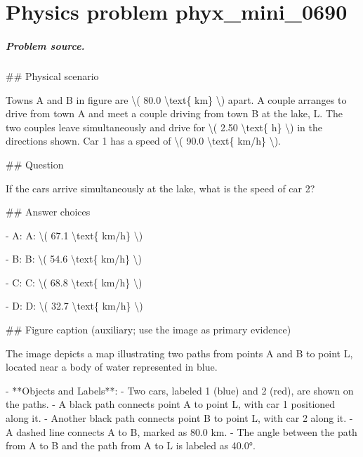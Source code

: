 
\chapter{Physics problem phyx\_mini\_0690}
\label{ch:PhyXMiniProblems_problem_phyx_mini_0690}

\paragraph{Problem source.}
\#\# Physical scenario

Towns A and B in figure are \textbackslash{}( 80.0 \textbackslash{}text\{ km\} \textbackslash{}) apart. A couple arranges to drive from town A and meet a couple driving from town B at the lake, L. The two couples leave simultaneously and drive for \textbackslash{}( 2.50 \textbackslash{}text\{ h\} \textbackslash{}) in the directions shown. Car 1 has a speed of \textbackslash{}( 90.0 \textbackslash{}text\{ km/h\} \textbackslash{}).

\#\# Question

If the cars arrive simultaneously at the lake, what is the speed of car 2?

\#\# Answer choices

- A: A: \textbackslash{}( 67.1 \textbackslash{}text\{ km/h\} \textbackslash{})

- B: B: \textbackslash{}( 54.6 \textbackslash{}text\{ km/h\} \textbackslash{})

- C: C: \textbackslash{}( 68.8 \textbackslash{}text\{ km/h\} \textbackslash{})

- D: D: \textbackslash{}( 32.7 \textbackslash{}text\{ km/h\} \textbackslash{})

\#\# Figure caption (auxiliary; use the image as primary evidence)

The image depicts a map illustrating two paths from points A and B to point L, located near a body of water represented in blue. 

- **Objects and Labels**: 
  - Two cars, labeled 1 (blue) and 2 (red), are shown on the paths.
  - A black path connects point A to point L, with car 1 positioned along it.
  - Another black path connects point B to point L, with car 2 along it.
  - A dashed line connects A to B, marked as 80.0 km.
  - The angle between the path from A to B and the path from A to L is labeled as 40.0°.

